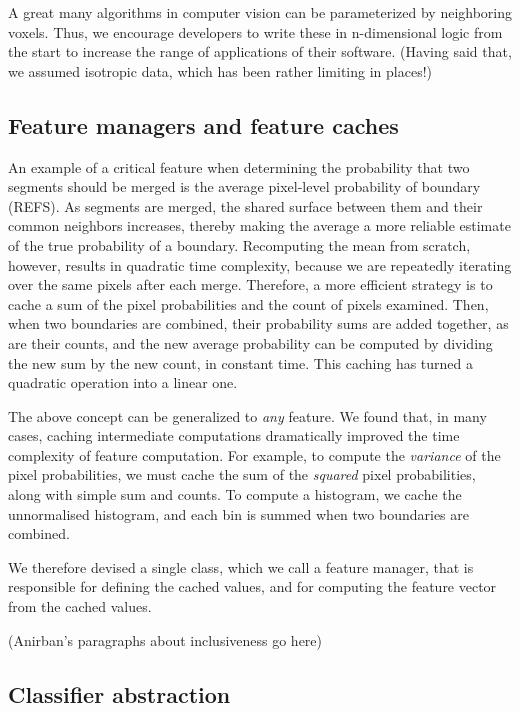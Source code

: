 \documentclass{frontiersSCNS} %
\begin{document}
A great many algorithms in computer vision can be parameterized by neighboring voxels.
Thus, we encourage developers to write these in n-dimensional logic from the start to increase the range of applications of their software.
(Having said that, we assumed isotropic data, which has been rather limiting in places!)

\subsection{Feature managers and feature caches}

An example of a critical feature when determining the probability that two segments should be merged is the average pixel-level probability of boundary (REFS).
As segments are merged, the shared surface between them and their common neighbors increases, thereby making the average a more reliable estimate of the true probability of a boundary.
Recomputing the mean from scratch, however, results in quadratic time complexity, because we are repeatedly iterating over the same pixels after each merge.
Therefore, a more efficient strategy is to cache a sum of the pixel probabilities and the count of pixels examined.
Then, when two boundaries are combined, their probability sums are added together, as are their counts, and the new average probability can be computed by dividing the new sum by the new count, in constant time.
This caching has turned a quadratic operation into a linear one.

The above concept can be generalized to \emph{any} feature.
We found that, in many cases, caching intermediate computations dramatically improved the time complexity of feature computation.
For example, to compute the \emph{variance} of the pixel probabilities, we must cache the sum of the \emph{squared} pixel probabilities, along with simple sum and counts.
To compute a histogram, we cache the unnormalised histogram, and each bin is summed when two boundaries are combined.

We therefore devised a single class, which we call a feature manager, that is responsible for defining the cached values, and for computing the feature vector from the cached values.

(Anirban's paragraphs about inclusiveness go here)

\subsection{Classifier abstraction}
\end{document}
